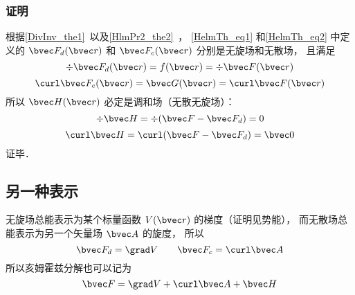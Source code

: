 \subsubsection{证明}
根据\autoref{DivInv_the1}~以及\autoref{HlmPr2_the2}~， \autoref{HelmTh_eq1} 和\autoref{HelmTh_eq2} 中定义的 $\bvec F_{d}(\bvec r)$ 和 $\bvec F_{c}(\bvec r)$ 分别是无旋场和无散场， 且满足
\begin{equation}
\div \bvec F_d(\bvec r) = f(\bvec r) = \div \bvec F(\bvec r)
\end{equation}
\begin{equation}
\curl \bvec F_c(\bvec r) = \bvec G(\bvec r) = \curl \bvec F(\bvec r)
\end{equation}
所以 $\bvec H(\bvec r)$ 必定是调和场（无散无旋场）：
\begin{equation}
\div \bvec H = \div (\bvec F - \bvec F_d) = 0
\end{equation}
\begin{equation}
\curl \bvec H = \curl (\bvec F - \bvec F_d) = \bvec 0
\end{equation}
证毕．

\subsection{另一种表示}

无旋场总能表示为某个标量函数 $V(\bvec r)$ 的梯度（证明见势能）， 而无散场总能表示为另一个矢量场 $\bvec A$ 的旋度， 所以
\begin{equation}
\bvec F_{d} = \grad V\qquad \bvec F_{c} = \curl \bvec A
\end{equation}
所以亥姆霍兹分解也可以记为
\begin{equation}
\bvec F = \grad V + \curl \bvec A + \bvec H
\end{equation}
